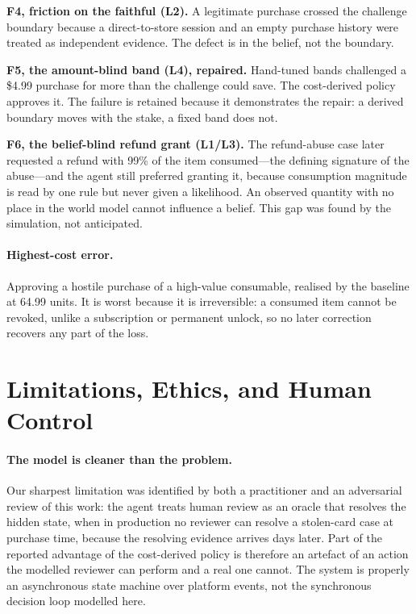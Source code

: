 \documentclass{article}
\begin{document}
\textbf{F4, friction on the faithful (L2).} A legitimate purchase crossed the challenge
boundary because a direct-to-store session and an empty purchase history were treated as
independent evidence. The defect is in the belief, not the boundary.

\textbf{F5, the amount-blind band (L4), repaired.} Hand-tuned bands challenged a \$4.99
purchase for more than the challenge could save. The cost-derived policy approves it. The
failure is retained because it demonstrates the repair: a derived boundary moves with the
stake, a fixed band does not.

\textbf{F6, the belief-blind refund grant (L1/L3).} The refund-abuse case later requested a
refund with 99\% of the item consumed---the defining signature of the abuse---and the agent
still preferred granting it, because consumption magnitude is read by one rule but never
given a likelihood. An observed quantity with no place in the world model cannot influence
a belief. This gap was found by the simulation, not anticipated.

\paragraph{Highest-cost error.} Approving a hostile purchase of a high-value consumable,
realised by the baseline at 64.99 units. It is worst because it is irreversible: a consumed
item cannot be revoked, unlike a subscription or permanent unlock, so no later correction
recovers any part of the loss.

\section{Limitations, Ethics, and Human Control}
\label{sec:limitations}

\paragraph{The model is cleaner than the problem.} Our sharpest limitation was identified by
both a practitioner and an adversarial review of this work: the agent treats human review as
an oracle that resolves the hidden state, when in production no reviewer can resolve a
stolen-card case at purchase time, because the resolving evidence arrives days later. Part
of the reported advantage of the cost-derived policy is therefore an artefact of an action
the modelled reviewer can perform and a real one cannot. The system is properly an
asynchronous state machine over platform events, not the synchronous decision loop modelled
here.
\end{document}
